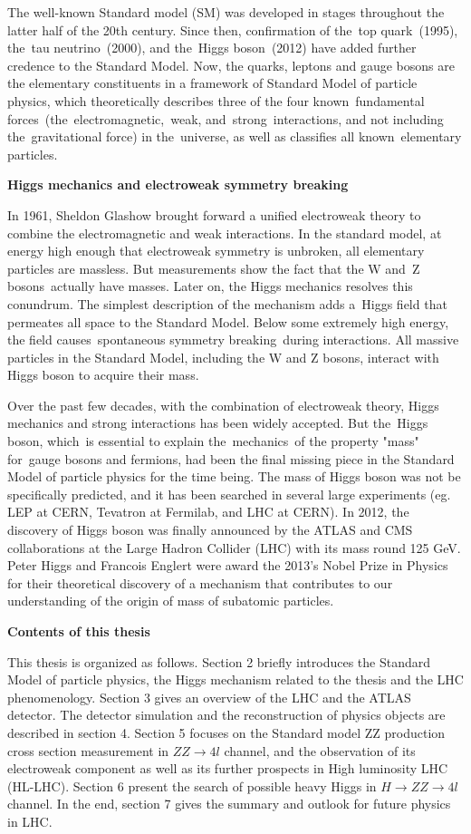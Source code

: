 The well-known Standard model (SM) was developed in stages throughout the latter half of the 20th century. Since then, confirmation of the top quark (1995), the tau neutrino (2000), and the Higgs boson (2012) have added further credence to the Standard Model.
Now, the quarks, leptons and gauge bosons are the elementary constituents in a framework of Standard Model of particle physics, which theoretically describes three of the four known fundamental forces (the electromagnetic, weak, and strong interactions, and not including the gravitational force) in the universe, as well as classifies all known elementary particles.

\textbf{Higgs mechanics and electroweak symmetry breaking}

In 1961, Sheldon Glashow brought forward a unified electroweak theory to combine the electromagnetic and weak interactions. In the standard model, at energy high enough that electroweak symmetry is unbroken, all elementary particles are massless. But measurements show the fact that the W and Z bosons actually have masses. Later on, the Higgs mechanics resolves this conundrum. The simplest description of the mechanism adds a Higgs field that permeates all space to the Standard Model. Below some extremely high energy, the field causes spontaneous symmetry breaking during interactions. All massive particles in the Standard Model, including the W and Z bosons, interact with Higgs boson to acquire their mass.

Over the past few decades, with the combination of electroweak theory, Higgs mechanics and strong interactions has been widely accepted. But the Higgs boson, which is essential to explain the mechanics of the property "mass" for gauge bosons and fermions, had been the final missing piece in the Standard Model of particle physics for the time being. The mass of Higgs boson was not be specifically predicted, and it has been searched in several large experiments (eg. LEP at CERN, Tevatron at Fermilab, and LHC at CERN). In 2012, the discovery of Higgs boson was finally announced by the ATLAS and CMS collaborations at the Large Hadron Collider (LHC) with its mass round 125 GeV. Peter Higgs and Francois Englert were award the 2013's Nobel Prize in Physics for their theoretical discovery of a mechanism that contributes to our understanding of the origin of mass of subatomic particles.

\textbf{Contents of this thesis}

This thesis is organized as follows. Section 2 briefly introduces the Standard Model of particle physics, the Higgs mechanism related to the thesis and the LHC phenomenology. Section 3 gives an overview of the LHC and the ATLAS detector. The detector simulation and the reconstruction of physics objects are described in section 4. Section 5 focuses on the Standard model ZZ production cross section measurement in $ZZ \rightarrow 4l$ channel, and the observation of its electroweak component as well as its further prospects in High luminosity LHC (HL-LHC). Section 6 present the search of possible heavy Higgs in $H \rightarrow ZZ \rightarrow 4l$ channel. In the end, section 7 gives the summary and outlook for future physics in LHC.


